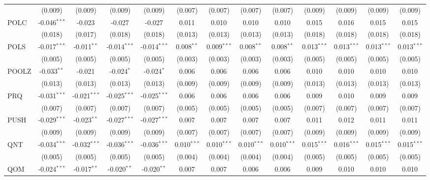 \begin{table}[!htbp]
\begin{tabular}{@{\extracolsep{5pt}}lcccccccccccc}
  & (0.009) & (0.009) & (0.009) & (0.009) & (0.007) & (0.007) & (0.007) & (0.007) & (0.009) & (0.009) & (0.009) & (0.009) \\
 POLC & -0.046$^{***}$ & -0.023$^{}$ & -0.027$^{}$ & -0.027$^{}$ & 0.011$^{}$ & 0.010$^{}$ & 0.010$^{}$ & 0.010$^{}$ & 0.015$^{}$ & 0.016$^{}$ & 0.015$^{}$ & 0.015$^{}$ \\
  & (0.018) & (0.017) & (0.018) & (0.018) & (0.013) & (0.013) & (0.013) & (0.013) & (0.018) & (0.018) & (0.018) & (0.018) \\
 POLS & -0.017$^{***}$ & -0.011$^{**}$ & -0.014$^{***}$ & -0.014$^{***}$ & 0.008$^{**}$ & 0.009$^{***}$ & 0.008$^{**}$ & 0.008$^{**}$ & 0.013$^{***}$ & 0.013$^{***}$ & 0.013$^{***}$ & 0.013$^{***}$ \\
  & (0.005) & (0.005) & (0.005) & (0.005) & (0.003) & (0.003) & (0.003) & (0.003) & (0.005) & (0.005) & (0.005) & (0.005) \\
 POOLZ & -0.033$^{**}$ & -0.021$^{}$ & -0.024$^{*}$ & -0.024$^{*}$ & 0.006$^{}$ & 0.006$^{}$ & 0.006$^{}$ & 0.006$^{}$ & 0.010$^{}$ & 0.010$^{}$ & 0.010$^{}$ & 0.010$^{}$ \\
  & (0.013) & (0.013) & (0.013) & (0.013) & (0.009) & (0.009) & (0.009) & (0.009) & (0.013) & (0.013) & (0.013) & (0.013) \\
 PRQ & -0.031$^{***}$ & -0.021$^{***}$ & -0.025$^{***}$ & -0.025$^{***}$ & 0.006$^{}$ & 0.006$^{}$ & 0.006$^{}$ & 0.006$^{}$ & 0.009$^{}$ & 0.010$^{}$ & 0.009$^{}$ & 0.009$^{}$ \\
  & (0.007) & (0.007) & (0.007) & (0.007) & (0.005) & (0.005) & (0.005) & (0.005) & (0.007) & (0.007) & (0.007) & (0.007) \\
 PUSH & -0.029$^{***}$ & -0.023$^{**}$ & -0.027$^{***}$ & -0.027$^{***}$ & 0.007$^{}$ & 0.007$^{}$ & 0.007$^{}$ & 0.007$^{}$ & 0.011$^{}$ & 0.012$^{}$ & 0.011$^{}$ & 0.011$^{}$ \\
  & (0.009) & (0.009) & (0.009) & (0.009) & (0.007) & (0.007) & (0.007) & (0.007) & (0.009) & (0.009) & (0.009) & (0.009) \\
 QNT & -0.034$^{***}$ & -0.032$^{***}$ & -0.036$^{***}$ & -0.036$^{***}$ & 0.010$^{***}$ & 0.010$^{***}$ & 0.010$^{***}$ & 0.010$^{***}$ & 0.015$^{***}$ & 0.016$^{***}$ & 0.015$^{***}$ & 0.015$^{***}$ \\
  & (0.005) & (0.005) & (0.005) & (0.005) & (0.004) & (0.004) & (0.004) & (0.004) & (0.005) & (0.005) & (0.005) & (0.005) \\
 QOM & -0.024$^{***}$ & -0.017$^{**}$ & -0.020$^{**}$ & -0.020$^{**}$ & 0.007$^{}$ & 0.007$^{}$ & 0.006$^{}$ & 0.006$^{}$ & 0.009$^{}$ & 0.010$^{}$ & 0.010$^{}$ & 0.010$^{}$ \\

\end{tabular}
\end{table}

